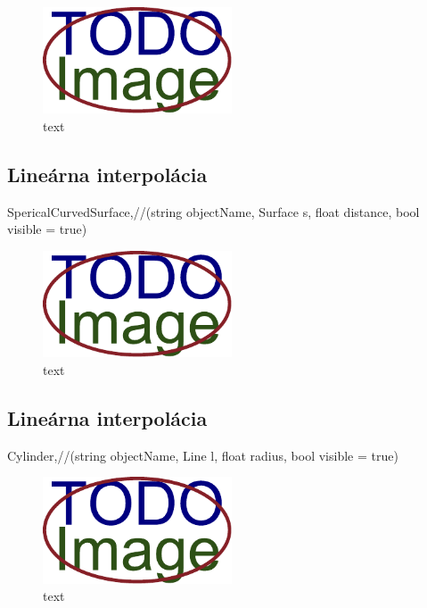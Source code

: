 \begin{figure}[H]
	\centering
	\includegraphics[width=0.5\textwidth]{obrazky-figures/placeholder.pdf}
	\caption{text}
	\label{fig:1}
\end{figure}


\subsection{Lineárna interpolácia}
SpericalCurvedSurface,//(string objectName, Surface s, float distance, bool visible = true)

\begin{figure}[H]
	\centering
	\includegraphics[width=0.5\textwidth]{obrazky-figures/placeholder.pdf}
	\caption{text}
	\label{fig:1}
\end{figure}



\subsection{Lineárna interpolácia}
Cylinder,//(string objectName, Line l, float radius, bool visible = true)

\begin{figure}[H]
	\centering
	\includegraphics[width=0.5\textwidth]{obrazky-figures/placeholder.pdf}
	\caption{text}
	\label{fig:1}
\end{figure}




